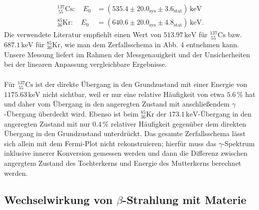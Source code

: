 \documentclass[german,  %
parskip=full,  %
]{scrartcl}
\begin{document}
\begin{align*}
^{137}_{\ 55}\mathrm{Cs}:\quad E_0 &= (535.4\pm 20.0_{\mathrm{sys}} \pm 3.6_{\mathrm{stat}})\,\mathrm{keV} \\
^{85}_{36}\mathrm{Kr}:\quad E_0 &= (640.6\pm 20.0_{\mathrm{sys}} \pm  4.8_{\mathrm{stat}})\,\mathrm{keV}.
\end{align*}
Die verwendete Literatur \cite{Anleitung} empfiehlt einen Wert von \(513.97\,\mathrm{keV}\) für \(^{137}_{\ 55}\mathrm{Cs}\) bzw. \(687.1\,\mathrm{keV}\) für \(^{85}_{36}\mathrm{Kr}\), wie man dem Zerfallsschema in Abb. 4 entnehmen kann. Unsere Messung liefert im Rahmen der Messgenauigkeit und der Unsicherheiten bei der linearen Anpassung vergleichbare Ergebnisse. \\\\
Für \(^{137}_{\ 55}\mathrm{Cs}\) ist der direkte Übergang in den Grundzustand mit einer Energie von \(1175.63\,\mathrm{keV}\) nicht sichtbar, weil er nur eine relative Häufigkeit von etwa \(5.6\,\%\) hat und daher vom Übergang in den angeregten Zustand mit anschließendem \(\gamma\)-Übergang überdeckt wird. Ebenso ist beim \(^{85}_{36}\mathrm{Kr}\) der \(173.1\,\mathrm{keV}\)-Übergang in den angeregten Zustand mit nur \(0.4\,\%\) relativer Häufigkeit gegenüber dem direkten Übergang in den Grundzustand unterdrückt. Das gesamte Zerfallsschema lässt sich allein mit dem Fermi-Plot nicht rekonstruieren; hierfür muss das \(\gamma\)-Spektrum inklusive innerer Konversion gemessen werden und dann die Differenz zwischen angergtem Zustand des Tochterkerns und Energie des Mutterkerns berechnet werden. 
\subsection{Wechselwirkung von \(\beta\)-Strahlung mit Materie}
\end{document}
